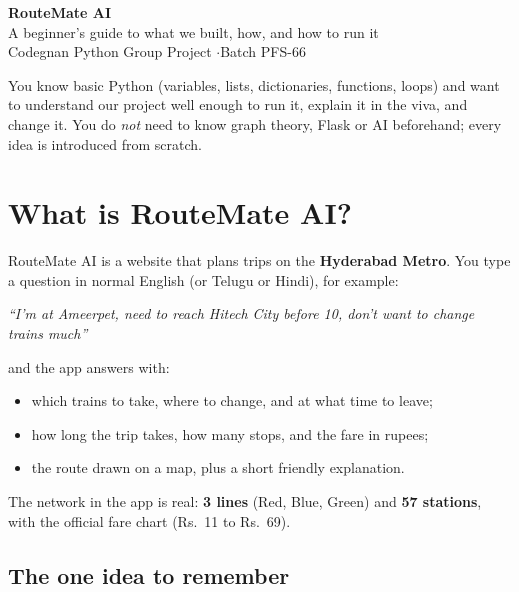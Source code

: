 \documentclass[11pt,a4paper]{article}
\begin{document}
\begin{center}
  {\Huge\bfseries RouteMate \textcolor{accent}{AI}}\\[0.4em]
  {\Large A beginner's guide to what we built, how, and how to run it}\\[0.6em]
  {\small Codegnan Python Group Project \quad$\cdot$\quad Batch PFS-66}
\end{center}

\vspace{0.4em}

\begin{tip}
You know basic Python (variables, lists, dictionaries, functions, loops) and want to
understand our project well enough to run it, explain it in the viva, and change it.
You do \emph{not} need to know graph theory, Flask or AI beforehand; every idea is
introduced from scratch.
\end{tip}

\tableofcontents

\section{What is RouteMate AI?}

RouteMate AI is a website that plans trips on the \textbf{Hyderabad Metro}.
You type a question in normal English (or Telugu or Hindi), for example:

\begin{center}
\itshape ``I'm at Ameerpet, need to reach Hitech City before 10, don't want to change trains much''
\end{center}

and the app answers with:
\begin{itemize}
  \item which trains to take, where to change, and at what time to leave;
  \item how long the trip takes, how many stops, and the fare in rupees;
  \item the route drawn on a map, plus a short friendly explanation.
\end{itemize}

The network in the app is real: \textbf{3 lines} (Red, Blue, Green) and \textbf{57 stations},
with the official fare chart (Rs.\ 11 to Rs.\ 69).

\subsection*{The one idea to remember}
\end{document}
